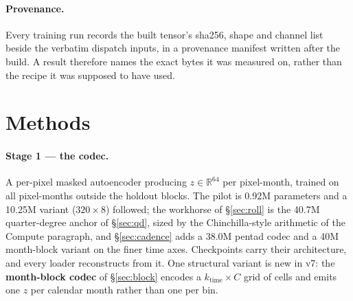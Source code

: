 \documentclass[10pt]{article}
\newcommand{\term}[1]{\textbf{#1}}
\begin{document}
\paragraph{Provenance.} Every training run records the built tensor's
sha256, shape and channel list beside the verbatim dispatch inputs, in
a provenance manifest written after the build. A result therefore
names the exact bytes it was measured on, rather than the recipe it
was supposed to have used.

\section{Methods}\label{sec:methods}

\paragraph{Stage 1 --- the codec.} A per-pixel masked autoencoder
producing $z\in\mathbb{R}^{64}$ per pixel-month, trained on all
pixel-months outside the holdout blocks. The pilot is 0.92M parameters
and a 10.25M variant ($320\times8$) followed; the workhorse of
\S\ref{sec:roll} is the 40.7M quarter-degree anchor of \S\ref{sec:qd},
sized by the Chinchilla-style arithmetic of the Compute paragraph, and
\S\ref{sec:cadence} adds a 38.0M pentad codec and a 40M month-block
variant on the finer time axes. Checkpoints carry their architecture, and
every loader reconstructs from it. One structural variant is new in v7:
the \term{month-block codec} of \S\ref{sec:block} encodes a
$k_{\mathrm{time}}\times C$ grid of cells and emits one $z$ per calendar
month rather than one per bin.
\end{document}
